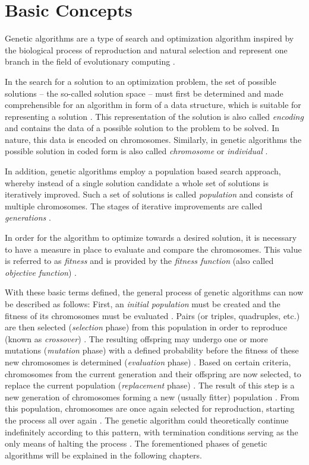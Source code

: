 \documentclass[sigconf]{acmart}
\begin{document}
\section{Basic Concepts}
Genetic algorithms are a type of search and optimization algorithm inspired
by the biological process of reproduction and natural selection and represent
one branch in the field of evolutionary computing \cite{goldberg1989, Carr2014}.

In the search for a solution to an optimization problem, the set of possible
solutions -- the so-called solution space -- must first be determined and made
comprehensible for an algorithm in form of a data structure, which is suitable
for representing a solution \cite{Affenzeller2009}.
This representation of the solution is also called \textit{encoding} and
contains the data of a possible solution to the problem to be solved.
In nature, this data is encoded on chromosomes. Similarly, in genetic algorithms
the possible solution in coded form is also called \textit{chromosome} or
\textit{individual} \cite{Affenzeller2009}.

In addition, genetic algorithms employ a population based search approach,
whereby instead of a single solution candidate a whole set of solutions is
iteratively improved. Such a set of solutions is called \textit{population}
and consists of multiple chromosomes. The stages of iterative improvements
are called \textit{generations} \cite{Affenzeller2009}.

In order for the algorithm to optimize towards a desired solution, it is
necessary to have a measure in place to evaluate and compare the chromosomes.
This value is referred to as \textit{fitness} and is provided by the
\textit{fitness function} (also called \textit{objective function})
\cite{Affenzeller2009}.

With these basic terms defined, the general process of genetic algorithms
can now be described as follows:
First, an \textit{initial population} must be created and the fitness of its
chromosomes must be evaluated \cite{Affenzeller2009}.
Pairs (or triples, quadruples, etc.) are then selected
(\textit{selection} phase) from this population in order to reproduce
(known as \textit{crossover}) \cite{Affenzeller2009}.
The resulting offspring may undergo one or more mutations
(\textit{mutation} phase) with a defined probability before the fitness of
these new chromosomes is determined (\textit{evaluation} phase)
\cite{Affenzeller2009}.
Based on certain criteria, chromosomes from the current generation and their
offspring are now selected, to replace the current population
(\textit{replacement} phase) \cite{Affenzeller2009}.
The result of this step is a new generation of chromosomes forming a new
(usually fitter) population \cite{Affenzeller2009}.
From this population, chromosomes are once again selected for reproduction,
starting the process all over again \cite{Affenzeller2009}.
The genetic algorithm could theoretically continue indefinitely according to
this pattern, with termination conditions serving as the only means of halting
the process \cite{Beligiannis2009}.
%
The forementioned phases of genetic algorithms will be explained in the
following chapters.
\end{document}

